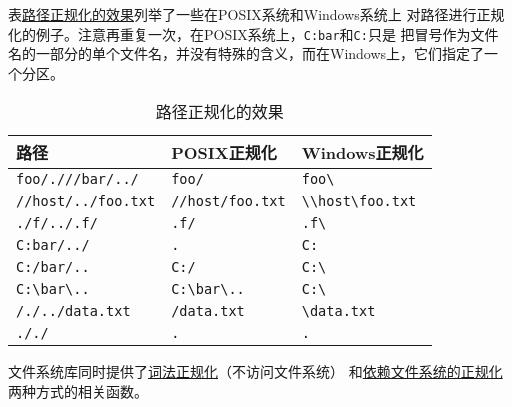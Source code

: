 表\hyperref[t20.1]{路径正规化的效果}列举了一些在POSIX系统和Windows系统上
对路径进行正规化的例子。注意再重复一次，在POSIX系统上，\texttt{C:bar}和\texttt{C:}只是
把冒号作为文件名的一部分的单个文件名，并没有特殊的含义，而在Windows上，它们指定了一个分区。
\begin{table}[htb]
    \centering
    \begin{tabular}{l|l|l}
        \hline
        \textbf{路径}                                    & \textbf{POSIX正规化}                              & \textbf{Windows正规化}                                               \\
        \hline
        \texttt{foo/.///bar/../}                       & \texttt{foo/}                                  & \texttt{foo\textbackslash}                                        \\
        \texttt{//host/../foo.txt}                     & \texttt{//host/foo.txt}                        & \texttt{\textbackslash \textbackslash host\textbackslash foo.txt} \\
        \texttt{./f/../.f/}                            & \texttt{.f/}                                   & \texttt{.f\textbackslash}                                         \\
        \texttt{C:bar/../}                             & \texttt{.}                                     & \texttt{C:}                                                       \\
        \texttt{C:/bar/..}                             & \texttt{C:/}                                   & \texttt{C:\textbackslash}                                         \\
        \texttt{C:\textbackslash bar\textbackslash ..} & \texttt{C:\textbackslash bar\textbackslash ..} & \texttt{C:\textbackslash}                                         \\
        \texttt{/./../data.txt}                        & \texttt{/data.txt}                             & \texttt{\textbackslash data.txt}                                  \\
        \texttt{././}                                  & \texttt{.}                                     & \texttt{.}                                                        \\
        \hline
    \end{tabular}
    \caption{路径正规化的效果}
    \label{t20.1}
\end{table}

文件系统库同时提供了\hyperref[ch20.3.3]{词法正规化}（不访问文件系统）
和\hyperref[ch20.4.5]{依赖文件系统的正规化}两种方式的相关函数。


